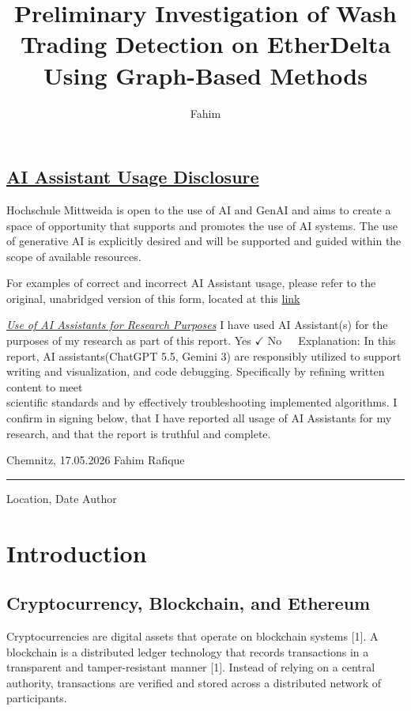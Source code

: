 \documentclass[language=english,thesis=bachelor,nosecondtitle,onesided,faculty=cb]{hsmw-thesis}
\title{Preliminary Investigation of Wash Trading Detection on EtherDelta Using Graph-Based Methods}
\author{Fahim}{Rafique}[B.Sc.]
\begin{document}
\section*{\underline{AI Assistant Usage Disclosure}}

Hochschule Mittweida is open to the use of AI and GenAI and aims to create a space of opportunity that supports and promotes the use of AI systems. The use of generative AI is explicitly desired and will be supported and guided within the scope of available resources.

For examples of correct and incorrect AI Assistant usage, please refer to the original, unabridged version of this form, located at this
\href{https://digital-campus.hs-mittweida.de/2026/02/handreichung-lehren-lernen-und-forschen-mit-generativer-ki/}{link}

\underline{\textit{Use of AI Assistants for Research Purposes}}
\newline
I have used AI Assistant(s) for the purposes of my research as part of this report.
\newline
\newline
Yes  $\boxed{\checkmark}$  \hspace{2cm}   No $\boxed{\phantom{\checkmark}}$
\newline 
\newline  
Explanation:
In this report, AI assistants(ChatGPT 5.5, Gemini 3) are responsibly utilized to support writing and visualization, and code debugging. Specifically by refining written content to meet \\
scientific standards and by effectively troubleshooting implemented algorithms.
\newline
\newline
\newline
I confirm in signing below, that I have reported all usage of AI Assistants for my research, and that the report is truthful and complete.
\newline
\newline

\noindent Chemnitz, 17.05.2026 \hfill Fahim Rafique \\
\rule{\linewidth}{0.5pt}
\noindent Location, Date \hfill Author \\

\clearpage


\chapter{Introduction}
	\section{Cryptocurrency, Blockchain, and Ethereum}		
Cryptocurrencies are digital assets that operate on blockchain systems [1]. A blockchain is a distributed ledger technology that records transactions in a transparent and tamper-resistant manner [1]. Instead of relying on a central authority, transactions are verified and stored across a distributed network of participants. 
\end{document}
